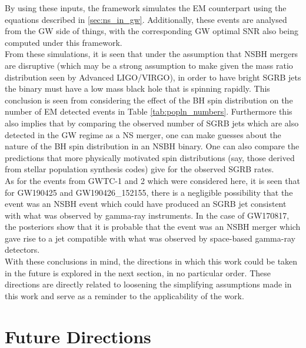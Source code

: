     By using these inputs, the framework simulates the EM counterpart using the
    equations described in \ref{sec:ns_in_gw}.  Additionally, these events are analysed
    from the GW side of things, with the corresponding GW optimal SNR also being
    computed under this framework.\\
    From these simulations, it is seen that under the assumption that NSBH mergers are
    disruptive (which may be a strong assumption to make given the mass ratio
    distribution seen by Advanced LIGO/VIRGO), in order to have bright SGRB jets the
    binary must have a low mass black hole that is spinning rapidly. This conclusion is
    seen from considering the effect of the BH spin distribution on the number of EM
    detected events in Table \ref{tab:popln_numbers}. Furthermore this also implies that
    by comparing the observed number of SGRB jets which are also detected in the GW
    regime as a NS merger, one can make guesses about the nature of the BH spin
    distribution in an NSBH binary. One can also compare the predictions that more
    physically motivated spin distributions (say, those derived from stellar population
    synthesis codes) give for the observed SGRB rates.\\
    As for the events from GWTC-1 and 2 which were considered here, it is seen that for
    GW190425 and GW190426\_152155, there is a negligible possibility that the event was
    an NSBH event which could have produced an SGRB jet consistent with what was
    observed by gamma-ray instruments. In the case of GW170817, the posteriors show that
    it is probable that the event was an NSBH merger which gave rise to a jet compatible
    with what was observed by space-based gamma-ray detectors.\\
    With these conclusions in mind, the directions in which this work could be taken in
    the future is explored in the next section, in no particular order. These directions
    are directly related to loosening the simplifying assumptions made in this work and
    serve as a reminder to the applicability of the work.

    \section{Future Directions}

